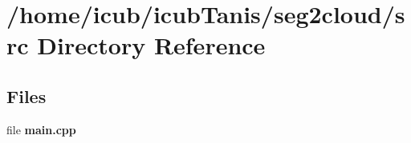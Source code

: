 \section{/home/icub/icub\-Tanis/seg2cloud/src Directory Reference}
\label{dir_68267d1309a1af8e8297ef4c3efbcdba}
\subsection*{Files}
\begin{DoxyCompactItemize}
\item 
file {\bfseries main.\-cpp}
\end{DoxyCompactItemize}
